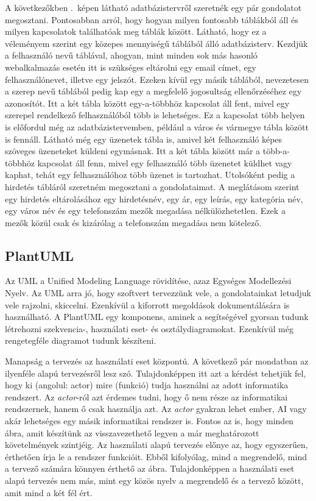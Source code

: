 \documentclass[]{thesis-ekf}
\theoremstyle{definition}
\theoremstyle{remark}
\begin{document}
	A következőkben .~képen látható adatbázistervről szeretnék egy pár gondolatot megosztani. Pontosabban arról, hogy hogyan milyen fontosabb táblákból áll és milyen kapcsolatok találhatóak meg táblák között. Látható, hogy ez a véleményem szerint egy közepes mennyiségű táblából álló adatbázisterv. Kezdjük a felhasználó nevű táblával, ahogyan, mint minden sok más hasonló webalkalmazás esetén itt is szükséges eltárolni egy email címet, egy felhasználónevet, illetve egy jelszót. Ezeken kívül egy másik táblából, nevezetesen a szerep nevű táblából pedig kap egy a megfelelő jogosultság ellenőrzéséhez egy azonosítót. Itt a két tábla között egy-a-többhöz kapcsolat áll fent, mivel egy szerepel rendelkező felhasználóból több is lehetséges. Ez a kapcsolat több helyen is előfordul még az adatbázistervemben, például a város és vármegye tábla között is fennáll. Látható még egy üzenetek tábla is, amivel két felhasználó képes szöveges üzeneteket küldeni egymásnak. Itt a két tábla között már a több-a-többhöz kapcsolat áll fenn, mivel egy felhasználó több üzenetet küldhet vagy kaphat, tehát egy felhasználóhoz több üzenet is tartozhat. Utolsóként pedig a hirdetés tábláról szeretném megosztani a gondolataimat. A meglátásom szerint egy hirdetés eltárolásához egy hirdetésnév, egy ár, egy leírás, egy kategória név, egy város név és egy telefonszám mezők megadása nélkülözhetetlen. Ezek a mezők közül csak és kizárólag a telefonszám megadása nem kötelező. 
	
	\subsection{PlantUML}\label{sc-plantuml}
	Az UML a Unified Modeling Language rövidítése, azaz Egységes Modellezési Nyelv. Az UML arra jó, hogy szoftvert tervezzünk vele, a gondolatainkat letudjuk vele rajzolni, skiccelni. Ezenkívül a kiforrott megoldások dokumentálására is használható. A PlantUML egy komponens, aminek a segítségével gyorsan tudunk létrehozni szekvencia-, használati eset- és osztálydiagramokat. Ezenkívül még rengetegféle diagramot tudunk készíteni. \cite{PlantUML}
	
	Manapság a tervezés az használati eset központú. A következő pár mondatban az ilyenféle alapú tervezésről lesz szó. Tulajdonképpen itt azt a kérdést tehetjük fel, hogy ki (angolul: actor) mire (funkció) tudja használni az adott informatika rendszert. Az \emph{actor}-ról azt érdemes tudni, hogy ő nem része az informatikai rendszernek, hanem ő csak használja azt. Az \emph{actor} gyakran lehet ember, AI vagy akár lehetséges egy másik informatikai rendszer is. Fontos az is, hogy minden ábra, amit készítünk az visszavezethető legyen a már meghatározott követelmények szintjéig. Az használati alapú tervezés előnye az, hogy egyszerűen, érthetően írja le a rendszer funkcióit. Ebből kifolyólag, mind a megrendelő, mind a tervező számára könnyen érthető az ábra. Tulajdonképpen a használati eset alapú tervezés nem más, mint egy közös nyelv a megrendelő és a tervező között, amit mind a két fél ért.\cite{Kusper Informatikai}
	
\end{document}
